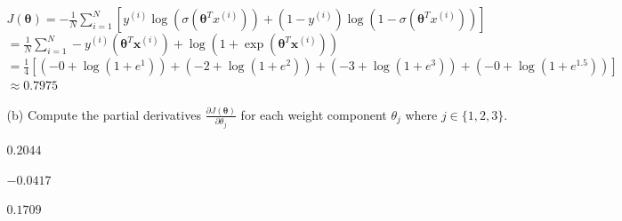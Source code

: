 \documentclass[11pt,addpoints,answers]{exam}
\newcommand{\xv}{\mathbf{x}}
\newcommand{\thetav}{\boldsymbol{\theta}}
\begin{document}
\begin{enumerate}
\begin{enumerate}[label=\alph*), itemsep=10pt]
			\begin{your_solution}[title=Work,height=6cm]
				$J(\thetav) = -\frac{1}{N} \sum_{i=1}^{N} \left[ y^{(i)} \log(\sigma(\thetav^T x^{(i)})) + (1 - y^{(i)}) \log(1 - \sigma(\thetav^T x^{(i)})) \right]$\\
				$=\frac{1}{N}\sum_{i=1}^N-y^{(i)}(\thetav^T \xv^{(i)})+\log(1+\exp(\thetav^T \xv^{(i)}))$\\
				$=\frac14\left[(-0+\log(1+e^1))+(-2+\log(1+e^2))+(-3+\log(1+e^3))+(-0+\log(1+e^{1.5}))\right]$\\
				$\approx 0.7975$
			\end{your_solution}
			
			\pagebreak
			
			\item[(b)] Compute the partial derivatives $\frac{\partial J(\thetav)}{\partial \theta_j}$ for each weight component $\theta_{j}$ where $j \in \{1, 2, 3\}$.
			
			\begin{your_solution}[title=$\partial J(\thetav)/\partial \theta_1$,height=1.8cm,width=5.2cm]
				$0.2044$
			\end{your_solution}
			\begin{your_solution}[title=$\partial J(\thetav)/\partial \theta_2$,height=1.8cm,width=5.2cm]
				$-0.0417$
			\end{your_solution}
			\begin{your_solution}[title=$\partial J(\thetav)/\partial \theta_3$,height=1.8cm,width=5.2cm]
				$0.1709$
			\end{your_solution}
			

\end{enumerate}
\end{enumerate}
\end{document}
